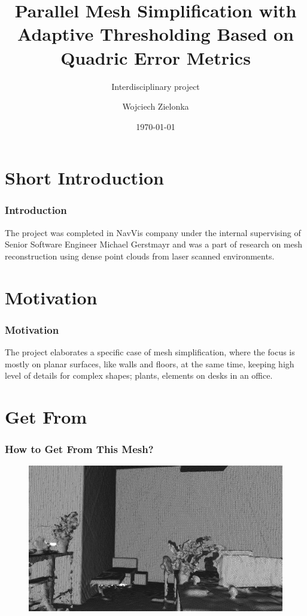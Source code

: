 \documentclass[
	10pt,
	t		%
]{beamer}
\title{Parallel Mesh Simplification with Adaptive Thresholding Based on Quadric Error Metrics}
\subtitle{Interdisciplinary project}
\author{Wojciech Zielonka}
\date{\today}
\begin{document}
\AddToShipoutPicture{\TitlePicture}
\maketitle
\ClearShipoutPicture
\AddToShipoutPicture{\BackgroundPicture}

\section{Short Introduction}
\centering
\begin{frame}
\frametitle{Introduction}
\begin{center}
The project was completed in NavVis company under the internal supervising of Senior Software Engineer Michael Gerstmayr and was a part of research on mesh reconstruction using dense point clouds from laser scanned environments.
\end{center}
\end{frame}

\section{Motivation}
\centering
\begin{frame}
\frametitle{Motivation}
\begin{center}
The project elaborates a specific case of mesh simplification, where the focus is mostly on planar surfaces, like walls and floors, at the same time, keeping high level of details for complex shapes; plants, elements on desks in an office.
\end{center}
\end{frame}

\section{Get From}
\begin{frame}
\frametitle{How to Get From This Mesh?}
\begin{figure}[ht]
	\centering
    \includegraphics[width=1\textwidth]{from}
\end{figure}
\end{frame}
\end{document}
